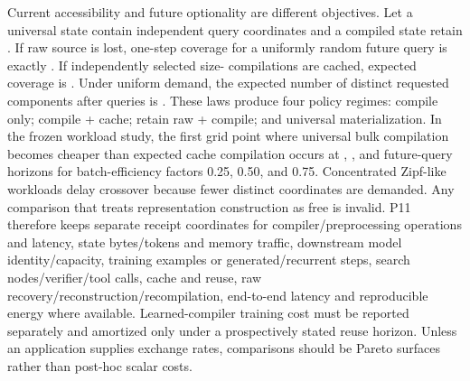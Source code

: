 \markdownRendererDocumentBegin
\markdownRendererSectionBegin
{}\markdownRendererInterblockSeparator
{}Current accessibility and future optionality are different objectives. Let a universal state contain  independent query coordinates and a compiled state retain .\markdownRendererInterblockSeparator
{}If raw source is lost, one-step coverage for a uniformly random future query is exactly . If  independently selected size- compilations are cached, expected coverage is . Under uniform demand, the expected number of distinct requested components after  queries is .\markdownRendererInterblockSeparator
{}These laws produce four policy regimes: compile only; compile + cache; retain raw + compile; and universal materialization. In the frozen workload study, the first grid point where universal bulk compilation becomes cheaper than expected cache compilation occurs at , , and  future-query horizons for batch-efficiency factors 0.25, 0.50, and 0.75. Concentrated Zipf-like workloads delay crossover because fewer distinct coordinates are demanded.\markdownRendererInterblockSeparator
{}Any comparison that treats representation construction as free is invalid. P11 therefore keeps separate receipt coordinates for compiler/preprocessing operations and latency, state bytes/tokens and memory traffic, downstream model identity/capacity, training examples or generated/recurrent steps, search nodes/verifier/tool calls, cache and reuse, raw recovery/reconstruction/recompilation, end-to-end latency and reproducible energy where available.\markdownRendererInterblockSeparator
{}Learned-compiler training cost must be reported separately and amortized only under a prospectively stated reuse horizon. Unless an application supplies exchange rates, comparisons should be Pareto surfaces rather than post-hoc scalar costs.
\markdownRendererSectionEnd \markdownRendererDocumentEnd